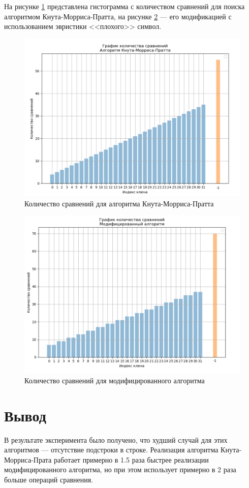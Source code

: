 На рисунке \ref{fig:graph_kmp} представлена гистограмма с количеством сравнений для поиска алгоритмом Кнута-Морриса-Пратта, на рисунке \ref{fig:graph_bm} --- его модификацией с использованием эвристики <<плохого>> символ.

\begin{figure}[h!]
	\centering
	\includegraphics[width=0.9\linewidth]{img/kmp_c}
	\caption{Количество сравнений для алгоритма Кнута-Морриса-Пратта}
	\label{fig:graph_kmp}
\end{figure}

\begin{figure}[h!]
	\centering
	\includegraphics[width=0.9\linewidth]{img/bm_c}
	\caption{Количество сравнений для модифицированного алгоритма}
	\label{fig:graph_bm}
\end{figure}

\clearpage


\section{Вывод}

В результате эксперимента было получено, что худший случай для этих алгоритмов --- отсутствие подстроки в строке.
Реализация алгоритма Кнута-Морриса-Прата работает примерно в 1.5 раза быстрее реализации модифицированного алгоритма, но при этом использует примерно в 2 раза больше операций сравнения.
